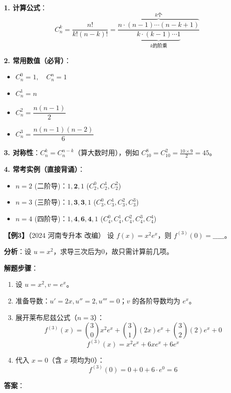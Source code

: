 \documentclass[12pt,a4paper]{article}
\begin{document}
\begin{tcolorbox}[colback=green!5!white, colframe=green!50!black, title=\textbf{★ 基础补给站：组合系数 $C_n^k$ 速算}]
\textbf{1. 计算公式}：
\[ C_n^k = \frac{n!}{k!(n-k)!} = \frac{\overbrace{n \cdot (n-1) \cdots (n-k+1)}^{k\text{个}}}{\underbrace{k \cdot (k-1) \cdots 1}_{k\text{的阶乘}}} \]

\textbf{2. 常用数值（必背）}：
\begin{itemize}
    \item $C_n^0 = 1, \quad C_n^n = 1$
    \item $C_n^1 = n$
    \item $C_n^2 = \dfrac{n(n-1)}{2}$
    \item $C_n^3 = \dfrac{n(n-1)(n-2)}{6}$
\end{itemize}

\textbf{3. 对称性}：$C_n^k = C_n^{n-k}$（算大数时用），例如 $C_{10}^8 = C_{10}^2 = \frac{10 \times 9}{2} = 45$。

\textbf{4. 常考实例（直接背诵）}：
\begin{itemize}
    \item $n=2$ (二阶导)：$1, \mathbf{2}, 1$ \quad ($C_2^0, C_2^1, C_2^2$)
    \item $n=3$ (三阶导)：$1, \mathbf{3}, \mathbf{3}, 1$ \quad ($C_3^0, C_3^1, C_3^2, C_3^3$)
    \item $n=4$ (四阶导)：$1, \mathbf{4}, \mathbf{6}, \mathbf{4}, 1$ \quad ($C_4^0, C_4^1, C_4^2, C_4^3, C_4^4$)
\end{itemize}
\end{tcolorbox}

\vspace{1em}

\textbf{【例3】}（2024 河南专升本 改编）
设 $f(x) = x^2 e^x$，则 $f^{(3)}(0) = \_\_\_\_\_$。

\begin{tiptip}
\textbf{分析}：设 $u=x^2$，求导三次后为0，故只需计算前几项。
\end{tiptip}

\textbf{解题步骤}：
\begin{enumerate}
    \item 设 $u=x^2, v=e^x$。
    \item 准备导数：$u'=2x, u''=2, u'''=0$；$v$ 的各阶导数均为 $e^x$。
    \item 展开莱布尼兹公式（$n=3$）：
    \[
    f^{(3)}(x) = \binom{3}{0} x^2 e^x + \binom{3}{1} (2x) e^x + \binom{3}{2} (2) e^x + 0
    \]
    \[
    f^{(3)}(x) = x^2 e^x + 6x e^x + 6 e^x
    \]
    \item 代入 $x=0$（含 $x$ 项均为0）：
    \[
    f^{(3)}(0) = 0 + 0 + 6 \cdot e^0 = 6
    \]
\end{enumerate}
\textbf{答案}：
\end{document}
